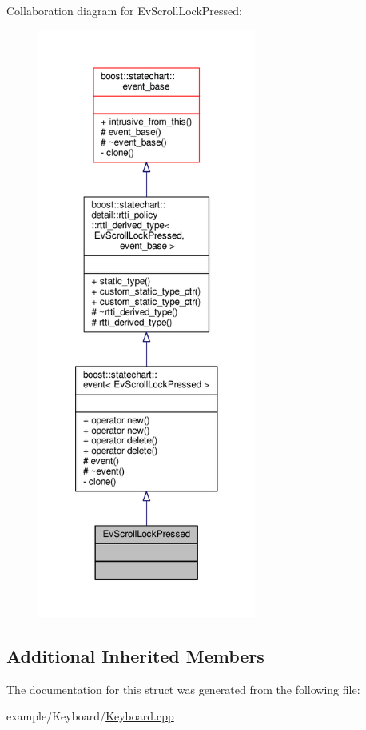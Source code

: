 Collaboration diagram for Ev\+Scroll\+Lock\+Pressed\+:
\nopagebreak
\begin{figure}[H]
\begin{center}
\leavevmode
\includegraphics[height=550pt]{struct_ev_scroll_lock_pressed__coll__graph}
\end{center}
\end{figure}
\subsection*{Additional Inherited Members}


The documentation for this struct was generated from the following file\+:\begin{DoxyCompactItemize}
\item 
example/\+Keyboard/\mbox{\hyperlink{_keyboard_8cpp}{Keyboard.\+cpp}}\end{DoxyCompactItemize}
